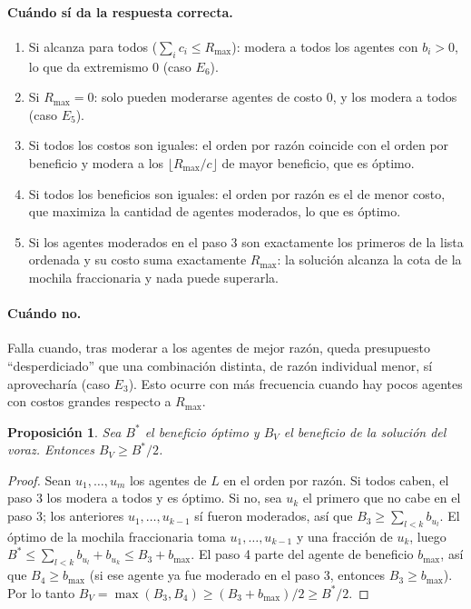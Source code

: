 \documentclass[11pt,letterpaper]{article}
\newtheorem{proposicion}{Proposición}
\newcommand{\Rmax}{R_{\max}}
\begin{document}
\paragraph{Cuándo sí da la respuesta correcta.}
\begin{enumerate}
  \item Si alcanza para todos ($\sum_i c_i \le \Rmax$): modera a todos los
        agentes con $b_i > 0$, lo que da extremismo $0$ (caso $E_6$).
  \item Si $\Rmax = 0$: solo pueden moderarse agentes de costo $0$, y los
        modera a todos (caso $E_5$).
  \item Si todos los costos son iguales: el orden por razón coincide con el
        orden por beneficio y modera a los $\lfloor \Rmax / c\rfloor$ de mayor
        beneficio, que es óptimo.
  \item Si todos los beneficios son iguales: el orden por razón es el de menor
        costo, que maximiza la cantidad de agentes moderados, lo que es
        óptimo.
  \item Si los agentes moderados en el paso 3 son exactamente los primeros de
        la lista ordenada y su costo suma exactamente $\Rmax$: la solución
        alcanza la cota de la mochila fraccionaria y nada puede superarla.
\end{enumerate}

\paragraph{Cuándo no.} Falla cuando, tras moderar a los agentes de mejor
razón, queda presupuesto ``desperdiciado'' que una combinación distinta, de
razón individual menor, sí aprovecharía (caso $E_3$). Esto ocurre con más
frecuencia cuando hay pocos agentes con costos grandes respecto a $\Rmax$.

\begin{proposicion}
Sea $B^*$ el beneficio óptimo y $B_V$ el beneficio de la solución del voraz.
Entonces $B_V \ge B^*/2$.
\end{proposicion}
\begin{proof}
Sean $u_1,\dots,u_m$ los agentes de $L$ en el orden por razón. Si todos caben,
el paso 3 los modera a todos y es óptimo. Si no, sea $u_k$ el primero que no
cabe en el paso 3; los anteriores $u_1,\dots,u_{k-1}$ sí fueron moderados, así
que $B_3 \ge \sum_{l<k} b_{u_l}$. El óptimo de la mochila fraccionaria toma
$u_1,\dots,u_{k-1}$ y una fracción de $u_k$, luego
$B^* \le \sum_{l<k} b_{u_l} + b_{u_k} \le B_3 + b_{\max}$. El paso 4 parte del
agente de beneficio $b_{\max}$, así que $B_4 \ge b_{\max}$ (si ese agente ya
fue moderado en el paso 3, entonces $B_3 \ge b_{\max}$). Por lo tanto
$B_V = \max(B_3, B_4) \ge (B_3 + b_{\max})/2 \ge B^*/2$.
\end{proof}
\end{document}
